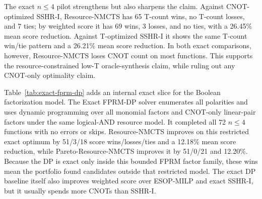 \documentclass[11pt]{article}
\newcommand{\method}{Resource-NMCTS}
\newcommand{\paretomethod}{Pareto-Resource-NMCTS}
\begin{document}
\begin{table}[t]
\centering
\small
\caption{\method{} compared with exported external baselines on the
177-function $n\leq 6$ extension.  SSHR-I rows use an 8 s per-call Gurobi
budget.  ABC-AIG rows use verified ABC-optimized BLIF and Bennett-style
resource estimates; ABC-XAG rows use verified ABC GIA/XOR-aware BLIF and
logical XAG estimates; ABC-LUT rows use verified LUT-mapped BLIF and local-ANF
node estimates; BDD rows use verified reduced ordered BDDs and Shannon-network
estimates; ABC-ESOP rows use verified \texttt{\&exorcism -q} ESOP-PLA and
logical-AND cube estimates.  Wins/losses/ties count common
functions; negative mean relative values favor \method{}.}
\label{tab:external-baselines}

\end{table}

The exact $n\leq 4$ pilot strengthens but also sharpens the claim.  Against
CNOT-optimized SSHR-I, \method{} has 65 T-count wins, no T-count losses, and 7
ties; by weighted score it has 69 wins, 3 losses, and no ties, with a 26.45\%
mean score reduction.  Against T-optimized SSHR-I it shows the same T-count
win/tie pattern and a 26.21\% mean score reduction.  In both exact comparisons,
however, \method{} loses CNOT count on most functions.  This supports the
resource-constrained low-T oracle-synthesis claim, while ruling out any
CNOT-only optimality claim.

\begin{table}[t]
\centering
\small
\caption{Exact bounded FPRM-DP comparison on the 72-function $n\leq 4$
traditional subset.  The dynamic program is exact over the configured
fixed-polarity FPRM factor model with monomial factors and CNOT-only
linear-pair factors; it is not a global reversible-circuit optimum.  Negative
mean score changes favor the left-hand method in each comparison.}
\label{tab:exact-fprm-dp}

\end{table}

Table~\ref{tab:exact-fprm-dp} adds an internal exact slice for the Boolean
factorization model.  The Exact FPRM-DP solver enumerates all polarities and
uses dynamic programming over all monomial factors and CNOT-only linear-pair
factors under the same logical-AND resource model.  It completed all 72
$n\leq 4$ functions with no errors or skips.  \method{} improves on this
restricted exact optimum by 51/3/18 score wins/losses/ties and a 12.18\% mean
score reduction, while \paretomethod{} improves it by 51/0/21 and 12.20\%.
Because the DP is exact only inside this bounded FPRM factor family, these wins
mean the portfolio found candidates outside that restricted model.  The exact
DP baseline itself also improves weighted score over ESOP-MILP and exact
SSHR-I, but it usually spends more CNOTs than SSHR-I.
\end{document}
